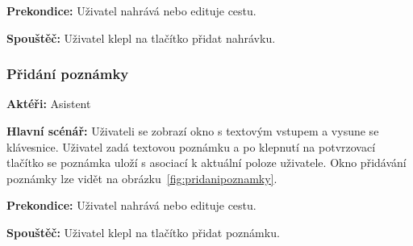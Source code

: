 \documentclass[czech,master,public,dept460,male,java,cpdeclaration]{diploma}
\newcommand{\usecase}[2]{\subsubsection{#1}\label{#2}}
\begin{document}
\vspace{0.1cm}
\noindent
\textbf{Prekondice:} Uživatel nahrává nebo edituje cestu.

\vspace{0.1cm}
\noindent
\textbf{Spouštěč:} Uživatel klepl na tlačítko přidat nahrávku.




\usecase{Přidání poznámky}{pridanipoznamky}
\textbf{Aktéři:} Asistent

\vspace{0.1cm}
\noindent
\textbf{Hlavní scénář:} Uživateli se zobrazí okno s textovým vstupem a vysune se klávesnice. Uživatel
zadá textovou poznámku a po klepnutí na potvrzovací tlačítko se poznámka uloží s asociací k aktuální poloze
uživatele. Okno přidávání poznámky lze vidět na obrázku~\ref{fig:pridanipoznamky}.

\vspace{0.1cm}
\noindent
\textbf{Prekondice:} Uživatel nahrává nebo edituje cestu.

\vspace{0.1cm}
\noindent
\textbf{Spouštěč:} Uživatel klepl na tlačítko přidat poznámku.
\end{document}
